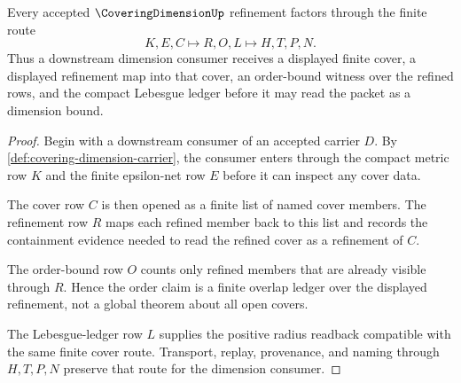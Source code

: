 \begin{theorem}
\label{thm:covering-dimension-refinement-order}
Every accepted $\CoveringDimensionUp$ refinement factors through the finite route
$$
K,E,C \longmapsto R,O,L \longmapsto H,T,P,N .
$$
Thus a downstream dimension consumer receives a displayed finite cover, a displayed refinement map into that cover, an order-bound witness over the refined rows, and the compact Lebesgue ledger before it may read the packet as a dimension bound.
\end{theorem}
\begin{proof}
Begin with a downstream consumer of an accepted carrier $D$. By \autoref{def:covering-dimension-carrier}, the consumer enters through the compact metric row $K$ and the finite epsilon-net row $E$ before it can inspect any cover data.

The cover row $C$ is then opened as a finite list of named cover members. The refinement row $R$ maps each refined member back to this list and records the containment evidence needed to read the refined cover as a refinement of $C$.

The order-bound row $O$ counts only refined members that are already visible through $R$. Hence the order claim is a finite overlap ledger over the displayed refinement, not a global theorem about all open covers.

The Lebesgue-ledger row $L$ supplies the positive radius readback compatible with the same finite cover route. Transport, replay, provenance, and naming through $H,T,P,N$ preserve that route for the dimension consumer.
\end{proof}

